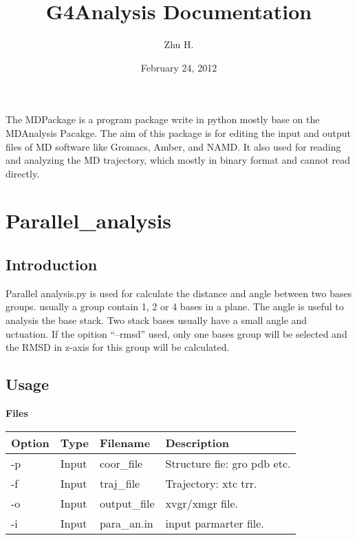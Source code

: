 \documentclass[letterpaper,10pt,english]{sphinxmanual}
\title{G4Analysis Documentation}
\date{February 24, 2012}
\author{Zhu H.}
\begin{document}
\maketitle
\tableofcontents
{}\label{index::doc}


The MDPackage is a program package write in python mostly base on the
MDAnalysis Pacakge. The aim of this package is for editing the input and
output files of MD software like Gromacs, Amber, and NAMD. It also used for
reading and analyzing the MD trajectory, which mostly in binary format and
cannot read directly.


\chapter{Parallel\_analysis}
\label{documentation_pages/Parallel_analysis:welcome-to-mdpackage-s-documentation}\label{documentation_pages/Parallel_analysis::doc}\label{documentation_pages/Parallel_analysis:parallel-analysis}

\section{Introduction}
\label{documentation_pages/Parallel_analysis:introduction}
Parallel analysis.py is used for calculate the distance and angle between two
bases groups. usually a group contain 1, 2 or 4 bases in a plane.
The angle is useful to analysis the base stack. Two stack bases usually have a
small angle and
uctuation.
If the opition ``--rmsd'' used, only one bases group will be selected and the RMSD
in z-axis for this group will be calculated.


\section{Usage}
\label{documentation_pages/Parallel_analysis:usage}
\textbf{Files}

\begin{tabulary}{\linewidth}{|L|L|L|L|}
\hline
\textbf{
Option
} & \textbf{
Type
} & \textbf{
Filename
} & \textbf{
Description
}\\
\hline

-p
 & 
Input
 & 
coor\_file
 & 
Structure fie: gro pdb etc.
\\

-f
 & 
Input
 & 
traj\_file
 & 
Trajectory: xtc trr.
\\

-o
 & 
Input
 & 
output\_file
 & 
xvgr/xmgr file.
\\

-i
 & 
Input
 & 
para\_an.in
 & 
input parmarter file.
\\
\hline
\end{tabulary}
\end{document}
